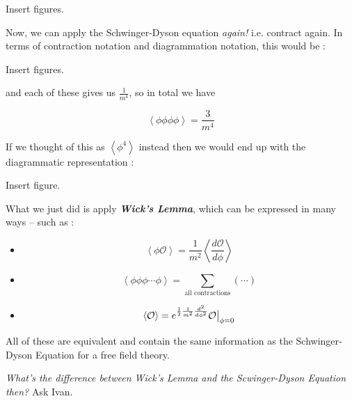 \documentclass{article}
\newcommand{\cO}{\mathcal{O}}
\newcommand{\mean}[1]{\left\langle #1 \right\rangle}
\newcommand{\restr}[2]{{%
  \left.\kern-\nulldelimiterspace %
  #1 %
  \vphantom{\big|} %
  \right|_{#2} %
  }}
\begin{document}
\vskip 0.5cm
Insert figures.

\vskip 0.5cm
Now, we can apply the Schwinger-Dyson equation \emph{again!} i.e. contract again. In terms of contraction notation and diagrammation notation, this would be :

\vskip 0.5cm
Insert figures.

and each of these gives us $\frac{1}{m^4}$, so in total we have 

\[ \mean{\phi \phi \phi \phi} = \frac{3}{m^4} \]

\vskip 0.5cm
If we thought of this as $\mean{\phi^4}$ instead then we would end up with the diagrammatic representation : 

\vskip 0.5cm
Insert figure.

\vskip 0.5cm
\begin{mathdefinitionbox}{}
  What we just did is apply \emph{\textbf{Wick's Lemma}}, which can be expressed in many ways -- such as : 

\begin{itemize}
  \item \[ \boxed{\mean{\phi \cO} = \frac{1}{m^2} \mean{\frac{d\cO}{d\phi}} } \]
  \item \[ \mean{\phi \phi \phi \cdots \phi} = \sum_{\text{all contractions}} \left( \cdots \right)\]
  \item \[ \mean{\cO} = e^{\frac{1}{2}\frac{1}{m^2}\frac{d^2}{d\phi^2}} \restr{\cO}{\phi = 0} \]
\end{itemize}
\end{mathdefinitionbox}

\vskip 0.5cm
All of these are equivalent and contain the same information as the Schwinger-Dyson Equation for a free field theory.

\begin{dottedbox}
  \emph{What's the difference between Wick's Lemma and the Scwinger-Dyson Equation then?} Ask Ivan.
\end{dottedbox}
\end{document}
